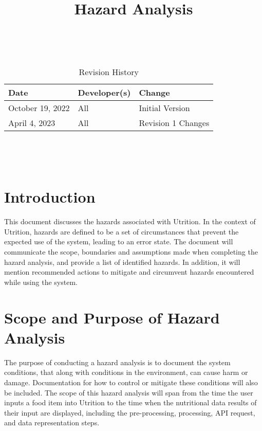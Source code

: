 \documentclass{article}
\title{Hazard Analysis\\\progname}
\author{\authname}
\date{}
\begin{document}
\maketitle
\thispagestyle{empty}

~\newpage


\begin{table}[hp]
	\caption{Revision History} \label{TblRevisionHistory}
	\begin{tabularx}{\textwidth}{llX}
		\toprule
		\textbf{Date} & \textbf{Developer(s)} & \textbf{Change}\\
		\midrule
		October 19, 2022 & All & Initial Version\\
		April 4, 2023 & All & Revision 1 Changes\\
		\bottomrule
	\end{tabularx}
\end{table}

~\newpage

\tableofcontents
\listoftables

~\newpage



\section{Introduction}

This document discusses the hazards associated with Utrition. In the context 
of Utrition, hazards are defined to be a set of circumstances that prevent 
the expected use of the system, leading to an error state. The document will 
communicate the scope, boundaries and assumptions made when completing the 
hazard analysis, and provide a list of identified hazards. In addition, it will 
mention recommended actions to mitigate and circumvent hazards encountered 
while using the system.

\section{Scope and Purpose of Hazard Analysis}
The purpose of conducting a hazard analysis is to document the system conditions, that along with conditions in the environment, can cause harm or damage. Documentation for how to control or mitigate these conditions will also be included. The scope of this hazard analysis will span from the time the user inputs a food item into Utrition to the time when the nutritional data results of their input are displayed, including the pre-processing, processing, API request, and data representation steps.
\end{document}
